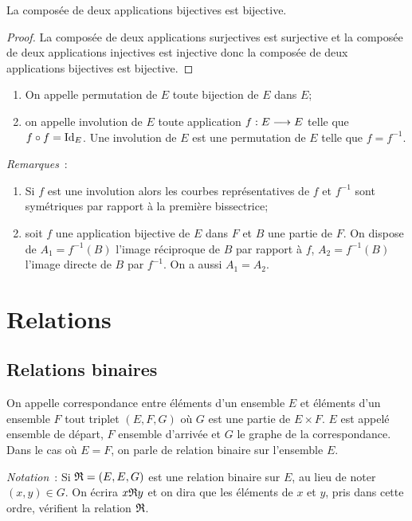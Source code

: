\begin{prop}
    La composée de deux applications bijectives est bijective.
\end{prop}

\begin{proof}
    La composée de deux applications surjectives est surjective et la composée de 
    deux applications injectives est injective donc la composée de deux applications 
    bijectives est bijective.
\end{proof}

\begin{defdef}
    \begin{enumerate}
        \item On appelle permutation de \(E\) toute bijection de \(E\) dans \(E\);
        \item on appelle involution de \(E\) toute application 
            \(f:E \longrightarrow E\) telle que \(f \circ f = \operatorname{Id}_E\). Une 
            involution de \(E\) est une permutation de \(E\) telle que 
            \(f = f^{-1}\).
    \end{enumerate}
\end{defdef}

\emph{Remarques}~:
\begin{enumerate}
    \item Si \(f\) est une involution alors les courbes représentatives de \(f\) 
        et \(f^{-1}\) sont symétriques par rapport à la première bissectrice;
    \item soit \(f\) une application bijective de \(E\) dans \(F\) et \(B\) une 
        partie de \(F\). On dispose de \(A_1 = f^{-1}(B)\) l'image réciproque de 
        \(B\) par rapport à \(f\), \(A_2 = f^{-1}(B)\) l'image directe de \(B\) 
        par \(f^{-1}\). On a aussi \(A_1 = A_2\).
\end{enumerate}

\section{Relations}
\label{chap3-sec:relations}

\subsection{Relations binaires}
\label{chap3-subsec:relationbinaire}

\begin{defdef}
    On appelle correspondance entre éléments d'un ensemble \(E\) et éléments 
    d'un ensemble \(F\) tout triplet \((E, F, G)\) où \(G\) est une partie de \(E 
    \times F\). \(E\) est appelé ensemble de départ, \(F\) ensemble d'arrivée et 
    \(G\) le graphe de la correspondance. Dans le cas où \(E = F\), on parle de 
    relation binaire sur l'ensemble \(E\).
\end{defdef}
\emph{Notation}~: Si \(\mathfrak{R} = (E, E, G)\) est une relation binaire sur \(E\), 
au lieu de noter \((x, y) \in G\). On écrira \(x\mathfrak{R}{}y\) et on dira que les 
éléments de \(x\) et \(y\), pris dans cette ordre, vérifient la relation 
\(\mathfrak{R}\).

